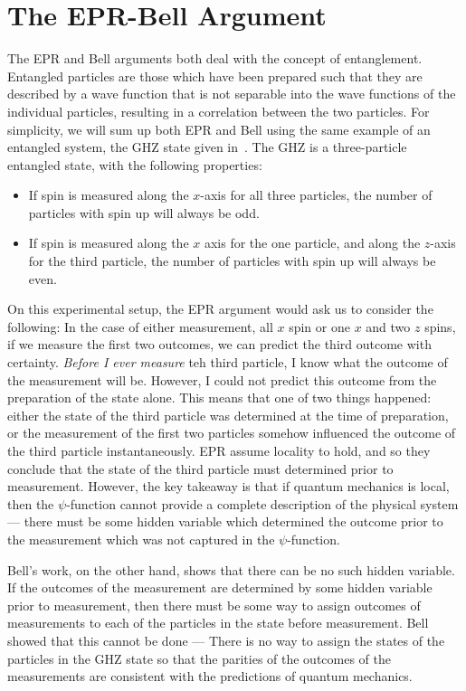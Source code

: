 \documentclass[11pt, a4paper]{article}
\begin{document}
\section{The EPR-Bell Argument}

The EPR and Bell arguments both deal with the concept of entanglement. Entangled
particles are those which have been prepared such that they are described by a
wave function that is not separable into the wave functions of the individual
particles, resulting in a correlation between the two particles. For simplicity,
we will sum up both EPR and Bell using the same example of an entangled system,
the GHZ state given in~\cite{GHZ_2007}. The GHZ is a three-particle entangled
state, with the following properties:
\begin{itemize}
    \item If spin is measured along the $x$-axis for all three particles, the 
          number of particles with spin up will always be odd.
    \item If spin is measured along the $x$ axis for the one particle, and along
          the $z$-axis for the third particle, the number of particles with spin
          up will always be even.
\end{itemize}

On this experimental setup, the EPR argument would ask us to consider the
following: In the case of either measurement, all $x$ spin or one $x$ and two
$z$ spins, if we measure the first two outcomes, we can predict the third outcome
with certainty. \textit{Before I ever measure} teh third particle, I know what 
the outcome of the measurement will be. However, I could not predict this
outcome from the preparation of the state alone. This means that one of two
things happened: either the state of the third particle was determined at the
time of preparation, or the measurement of the first two particles somehow
influenced the outcome of the third particle instantaneously. EPR assume
locality to hold, and so they conclude that the state of the third particle must
determined prior to measurement. However, the key takeaway is that if quantum
mechanics is local, then the $\psi$-function cannot provide a complete
description of the physical system — there must be some hidden variable which 
determined the outcome prior to the measurement which was not captured in the 
$\psi$-function.

Bell's work, on the other hand, shows that there can be no such hidden variable.
If the outcomes of the measurement are determined by some hidden variable prior
to measurement, then there must be some way to assign outcomes of measurements 
to each of the particles in the state before measurement. Bell showed that this
cannot be done — There is no way to assign the states of the particles in the 
GHZ state so that the parities of the outcomes of the measurements are
consistent with the predictions of quantum mechanics.
\end{document}
